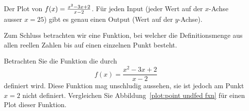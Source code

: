 \begin{marginfigure}[0in]
\caption{Der Plot von $f(x)=\protect\frac{x^2 - 3x + 2}{x-2}$. Für jeden Input (jeder Wert auf der $x$-Achse ausser $x=25$) gibt es genau einen Output (Wert auf der $y$-Achse).}
\label{plot:point undfed fxn}
\end{marginfigure}

Zum Schluss betrachten wir eine Funktion, bei welcher die Definitionsmenge aus allen reellen Zahlen bis auf einen einzelnen Punkt besteht.

\begin{example}
Betrachten Sie die Funktion die durch
\[
f(x) = \frac{x^2 - 3x + 2}{x-2}
\]
definiert wird. Diese Funktion mag unschludig aussehen, sie ist jedoch am Punkt $x=2$ nicht definiert. Vergleichen Sie Abbildung~\ref{plot:point undfed fxn} für einen Plot dieser Funktion.
\end{example}



